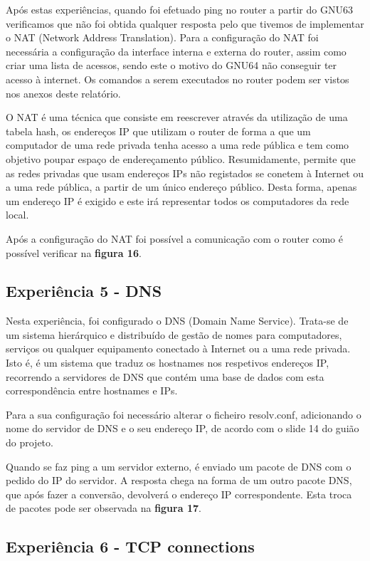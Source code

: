 \documentclass[article, a4paper, 11pt, oneside]{memoir}
\begin{document}
Após estas experiências, quando foi efetuado ping no router a partir do GNU63 verificamos que não foi obtida qualquer resposta pelo que tivemos de 
implementar o NAT (Network Address Translation). 
Para a configuração do NAT foi necessária a configuração da interface interna e externa do router, assim como criar uma lista de acessos, sendo este o motivo
do GNU64 não conseguir ter acesso à internet. Os comandos a serem executados no router podem ser vistos nos anexos deste relatório.

O NAT é uma técnica que consiste em reescrever através da utilização de uma tabela hash, 
os endereços IP que utilizam o router de forma a que
um computador de uma rede privada tenha acesso a uma rede pública e tem como objetivo poupar espaço de endereçamento público.
Resumidamente, permite que as redes privadas que usam endereços IPs não registados se conetem à Internet ou a uma rede pública,
a partir de um único endereço público. 
Desta forma, apenas um endereço IP é exigido e este irá representar todos os computadores da rede local.
 
Após a configuração do NAT foi possível a comunicação com o router como é possível verificar na \textbf{figura 16}.

\subsection{Experiência 5 - DNS}			

Nesta experiência, foi configurado o DNS (Domain Name Service). Trata-se de um sistema hierárquico e distribuído de gestão 
de nomes para computadores, serviços ou qualquer equipamento conectado à
 Internet ou a uma rede privada.
Isto é, é um sistema que traduz os hostnames nos respetivos endereços IP, 
recorrendo a servidores de DNS que contém uma base de dados com esta correspondência entre hostnames e IPs.

Para a sua configuração foi necessário alterar o ficheiro resolv.conf, 
adicionando o nome do servidor de DNS e o seu endereço IP, de acordo com o slide 14 do guião do projeto.

Quando se faz ping a um servidor externo, é enviado um pacote de DNS com o pedido do IP do servidor.
A resposta chega na forma de um outro pacote DNS, que após fazer a conversão, 
devolverá o endereço IP correspondente.
Esta troca de pacotes pode ser observada na \textbf{figura 17}.

\subsection{Experiência 6 - TCP connections}
\end{document}

